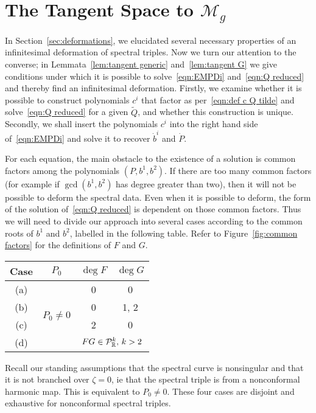 \documentclass{article}
\begin{document}
\section{The Tangent Space to \texorpdfstring{$\mathcal{M}_g$}{Mg}}\label{sec:tangent space}

In Section~\ref{sec:deformations}, we elucidated several necessary properties of an infinitesimal deformation of spectral triples. Now we turn our attention to the converse; in Lemmata~\ref{lem:tangent generic} and~\ref{lem:tangent G} we give conditions under which it is possible to solve~\eqref{eqn:EMPDi} and~\eqref{eqn:Q reduced} and thereby find an infinitesimal deformation. Firstly, we examine whether it is possible to construct polynomials $c^i$ that factor as per~\eqref{eqn:def c Q tilde} and solve~\eqref{eqn:Q reduced} for a given $\tilde{Q}$, and whether this construction is unique. Secondly, we shall insert the polynomials $c^i$ into the right hand side of~\eqref{eqn:EMPDi} and solve it to recover $\dot{b}^i$ and $\dot{P}$.

For each equation, the main obstacle to the existence of a solution is common factors among the polynomials $(P,b^1,b^2)$. If there are too many common factors (for example if $\gcd(b^1,b^2)$ has degree greater than two), then it will not be possible to deform the spectral data. Even when it is possible to deform, the form of the solution of~\eqref{eqn:Q reduced} is dependent on those common factors. Thus we will need to divide our approach into several cases according to the common roots of $b^1$ and $b^2$, labelled in the following table. Refer to Figure~\ref{fig:common factors} for the definitions of $F$ and $G$.
\begin{center}
\begin{tabular}{|c|c|c|c|}
\hline
Case & $P_0$ & $\deg F$ & $\deg G$ \\ \hline\hline
(a) & \multirow{4}{*}{$P_0 \neq 0$} & 0 & 0 \\ \cline{1-1}\cline{3-4}
(b) && 0 & 1, 2 \\ \cline{1-1}\cline{3-4}
(c) && 2 & 0 \\ \cline{1-1}\cline{3-4}
(d) && \multicolumn{2}{|c|}{$FG \in \mathcal{P}^k_{\mathbb{R}},\, k>2$} \\ \hline
\end{tabular}
\end{center}
Recall our standing assumptions that the spectral curve is nonsingular and that it is not branched over $\zeta=0$, ie that the spectral triple is from a nonconformal harmonic map. This is equivalent to $P_0 \neq 0$. These four cases are disjoint and exhaustive for nonconformal spectral triples. 
\end{document}
